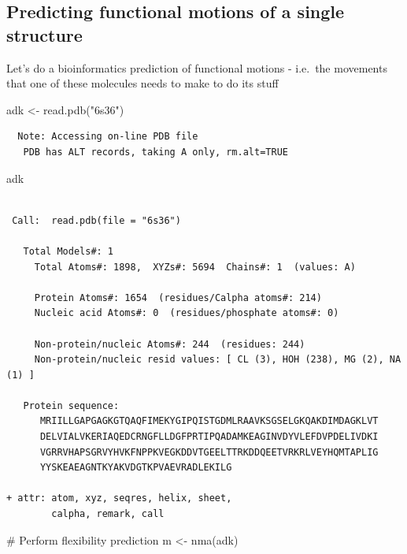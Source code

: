 \documentclass[
  letterpaper,
  DIV=11,
  numbers=noendperiod]{scrartcl}
\newenvironment{Shaded}{\begin{snugshade}}{\end{snugshade}}
\newcommand{\CommentTok}[1]{\textcolor[rgb]{0.37,0.37,0.37}{#1}}
\newcommand{\FunctionTok}[1]{\textcolor[rgb]{0.28,0.35,0.67}{#1}}
\newcommand{\NormalTok}[1]{\textcolor[rgb]{0.00,0.23,0.31}{#1}}
\newcommand{\OtherTok}[1]{\textcolor[rgb]{0.00,0.23,0.31}{#1}}
\newcommand{\StringTok}[1]{\textcolor[rgb]{0.13,0.47,0.30}{#1}}
\begin{document}
\subsection{Predicting functional motions of a single
structure}\label{predicting-functional-motions-of-a-single-structure}

Let's do a bioinformatics prediction of functional motions - i.e.~the
movements that one of these molecules needs to make to do its stuff

\begin{Shaded}
\begin{Highlighting}[]
\NormalTok{adk }\OtherTok{\textless{}{-}} \FunctionTok{read.pdb}\NormalTok{(}\StringTok{"6s36"}\NormalTok{)}
\end{Highlighting}
\end{Shaded}

\begin{verbatim}
  Note: Accessing on-line PDB file
   PDB has ALT records, taking A only, rm.alt=TRUE
\end{verbatim}

\begin{Shaded}
\begin{Highlighting}[]
\NormalTok{adk}
\end{Highlighting}
\end{Shaded}

\begin{verbatim}

 Call:  read.pdb(file = "6s36")

   Total Models#: 1
     Total Atoms#: 1898,  XYZs#: 5694  Chains#: 1  (values: A)

     Protein Atoms#: 1654  (residues/Calpha atoms#: 214)
     Nucleic acid Atoms#: 0  (residues/phosphate atoms#: 0)

     Non-protein/nucleic Atoms#: 244  (residues: 244)
     Non-protein/nucleic resid values: [ CL (3), HOH (238), MG (2), NA (1) ]

   Protein sequence:
      MRIILLGAPGAGKGTQAQFIMEKYGIPQISTGDMLRAAVKSGSELGKQAKDIMDAGKLVT
      DELVIALVKERIAQEDCRNGFLLDGFPRTIPQADAMKEAGINVDYVLEFDVPDELIVDKI
      VGRRVHAPSGRVYHVKFNPPKVEGKDDVTGEELTTRKDDQEETVRKRLVEYHQMTAPLIG
      YYSKEAEAGNTKYAKVDGTKPVAEVRADLEKILG

+ attr: atom, xyz, seqres, helix, sheet,
        calpha, remark, call
\end{verbatim}

\begin{Shaded}
\begin{Highlighting}[]
\CommentTok{\# Perform flexibility prediction }
\NormalTok{m }\OtherTok{\textless{}{-}} \FunctionTok{nma}\NormalTok{(adk)}
\end{Highlighting}
\end{Shaded}
\end{document}
